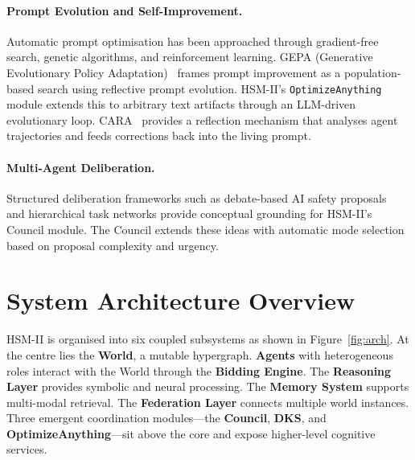 \documentclass[11pt]{article}
\begin{document}
\paragraph{Prompt Evolution and Self-Improvement.}
Automatic prompt optimisation has been approached through gradient-free search,
genetic algorithms, and reinforcement learning. GEPA (Generative Evolutionary Policy
Adaptation)~\cite{agrawal2025gepa} frames prompt improvement as a population-based
search using reflective prompt evolution. HSM-II's \texttt{OptimizeAnything} module extends this to arbitrary text
artifacts through an LLM-driven evolutionary loop. CARA~\cite{latimer2025hindsight}
provides a reflection mechanism that analyses agent trajectories and feeds
corrections back into the living prompt.

\paragraph{Multi-Agent Deliberation.}
Structured deliberation frameworks such as debate-based AI safety
proposals~\cite{irving2018ai} and hierarchical task networks provide conceptual
grounding for HSM-II's Council module. The Council extends these ideas with
automatic mode selection based on proposal complexity and urgency.

\section{System Architecture Overview}
\nopagebreak[4]
\label{sec:arch}

HSM-II is organised into six coupled subsystems as shown in
Figure~\ref{fig:arch}. At the centre lies the \textbf{World}, a mutable
hypergraph. \textbf{Agents} with heterogeneous roles interact with the World
through the \textbf{Bidding Engine}. The \textbf{Reasoning Layer} provides
symbolic and neural processing. The \textbf{Memory System} supports multi-modal
retrieval. The \textbf{Federation Layer} connects multiple world instances. Three
emergent coordination modules---the \textbf{Council}, \textbf{DKS}, and
\textbf{OptimizeAnything}---sit above the core and expose higher-level cognitive
services.
\end{document}

